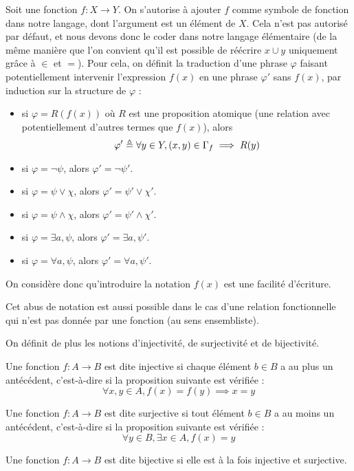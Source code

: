 \begin{notation}
  Soit une fonction $f : X \to Y$. On s'autorise à ajouter $f$ comme symbole de
  fonction dans notre langage, dont l'argument est un élément de $X$. Cela n'est
  pas autorisé par défaut, et nous devons donc le coder dans notre langage
  élémentaire (de la même manière que l'on convient qu'il est possible de
  réécrire $x\cup y$ uniquement grâce à $\in$ et $=$). Pour cela, on définit la
  traduction d'une phrase $\varphi$ faisant potentiellement intervenir
  l'expression $f(x)$ en une phrase $\varphi'$ sans $f(x)$, par induction sur
  la structure de $\varphi$ :
  \begin{itemize}
  \item si $\varphi = R(f(x))$ où $R$ est une proposition atomique (une relation
    avec potentiellement d'autres termes que $f(x)$), alors
    \[\varphi' \triangleq \forall y\in Y, (x,y)\in \Gamma_f \implies R(y)\]
  \item si $\varphi = \lnot \psi$, alors $\varphi' = \lnot \psi'$.
  \item si $\varphi = \psi \lor \chi$, alors $\varphi' = \psi'\lor \chi'$.
  \item si $\varphi = \psi \land \chi$, alors $\varphi' = \psi'\land \chi'$.
  \item si $\varphi = \exists a, \psi$, alors $\varphi' = \exists a, \psi'$.
  \item si $\varphi = \forall a, \psi$, alors $\varphi' = \forall a, \psi'$.
  \end{itemize}

  On considère donc qu'introduire la notation $f(x)$ est une facilité
  d'écriture.
\end{notation}

\begin{remark}
  Cet abus de notation est aussi possible dans le cas d'une relation
  fonctionnelle qui n'est pas donnée par une fonction (au sens ensembliste).
\end{remark}

On définit de plus les notions d'injectivité, de surjectivité et de bijectivité.

\begin{definition}
  Une fonction $f : A \to B$ est dite injective si chaque élément $b\in B$ a au
  plus un antécédent, c'est-à-dire si la proposition suivante est vérifiée :
  \[\forall x,y\in A, f(x) = f(y)\implies x=y\]

  Une fonction $f : A \to B$ est dite surjective si tout élément $b\in B$ a au
  moins un antécédent, c'est-à-dire si la proposition suivante est vérifiée :
  \[\forall y\in B, \exists x \in A, f(x)=y\]

  Une fonction $f : A \to B$ est dite bijective si elle est à la fois injective
  et surjective.
\end{definition}

